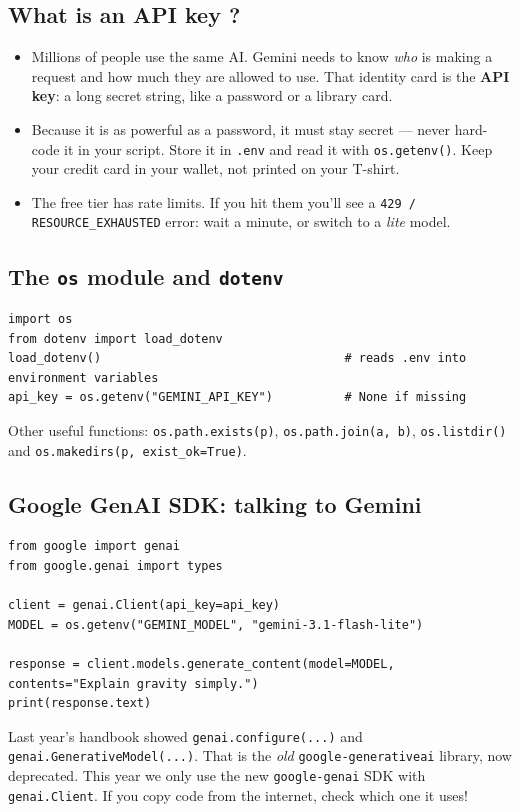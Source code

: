 \subsection{What is an API key ?}
\begin{itemize}
  \item Millions of people use the same AI. Gemini needs to know \emph{who} is making a request and how much they
        are allowed to use. That identity card is the \textbf{API key}: a long secret string, like a password or a
        library card.
  \item Because it is as powerful as a password, it must stay secret --- never hard-code it in your script.
        Store it in \texttt{.env} and read it with \texttt{os.getenv()}. Keep your credit card in your wallet,
        not printed on your T-shirt.
  \item The free tier has rate limits. If you hit them you'll see a \texttt{429 / RESOURCE\_EXHAUSTED} error:
        wait a minute, or switch to a \emph{lite} model.
\end{itemize}


\subsection{The \texttt{os} module and \texttt{dotenv}}
\begin{lstlisting}
import os
from dotenv import load_dotenv
load_dotenv()                                  # reads .env into environment variables
api_key = os.getenv("GEMINI_API_KEY")          # None if missing
\end{lstlisting}
Other useful functions: \texttt{os.path.exists(p)}, \texttt{os.path.join(a, b)}, \texttt{os.listdir()} and \texttt{os.makedirs(p, exist\_ok=True)}.

\subsection{Google GenAI SDK: talking to Gemini}
\begin{lstlisting}
from google import genai
from google.genai import types

client = genai.Client(api_key=api_key)
MODEL = os.getenv("GEMINI_MODEL", "gemini-3.1-flash-lite")

response = client.models.generate_content(model=MODEL, contents="Explain gravity simply.")
print(response.text)
\end{lstlisting}
\begin{note}
Last year's handbook showed \texttt{genai.configure(...)} and \texttt{genai.GenerativeModel(...)}. That is the
\emph{old} \texttt{google-generativeai} library, now deprecated. This year we only use the new \texttt{google-genai}
SDK with \texttt{genai.Client}. If you copy code from the internet, check which one it uses!
\end{note}

